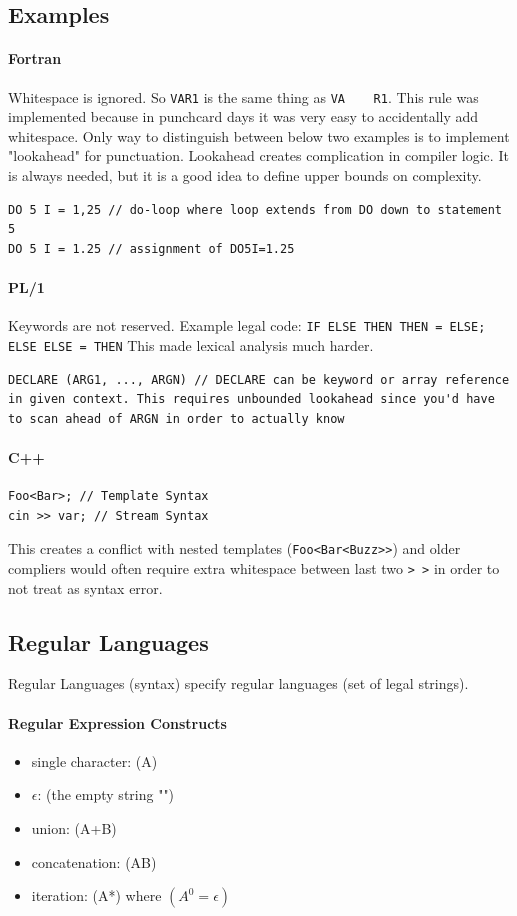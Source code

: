 \documentclass[a4paper, 10pt]{article}
\begin{document}
\subsection{Examples}
\paragraph{Fortran}
Whitespace is ignored. So \verb!VAR1! is the same thing as \verb!VA    R1!. This rule was implemented because in punchcard days it was very easy to accidentally add whitespace.
Only way to distinguish between below two examples is to implement "lookahead" for punctuation. Lookahead creates complication in compiler logic. It is always needed, but it is a good idea to define upper bounds on complexity.
\begin{lstlisting}[style=cpp]
DO 5 I = 1,25 // do-loop where loop extends from DO down to statement 5
DO 5 I = 1.25 // assignment of DO5I=1.25
\end{lstlisting}
\paragraph{PL/1}
Keywords are not reserved. Example legal code:
\verb!IF ELSE THEN THEN = ELSE; ELSE ELSE = THEN!
This made lexical analysis much harder.
\begin{lstlisting}[style=cpp]
DECLARE (ARG1, ..., ARGN) // DECLARE can be keyword or array reference in given context. This requires unbounded lookahead since you'd have to scan ahead of ARGN in order to actually know
\end{lstlisting}
\paragraph{C++}
\begin{lstlisting}[style=cpp]
Foo<Bar>; // Template Syntax
cin >> var; // Stream Syntax
\end{lstlisting}
This creates a conflict with nested templates (\verb!Foo<Bar<Buzz>>!) and older compliers would often require extra whitespace between last two \verb!> >! in order to not treat as syntax error.
\subsection{Regular Languages}
Regular Languages (syntax) specify regular languages (set of legal strings).
\paragraph{Regular Expression Constructs}
\begin{itemize}
	\item single character: (A)
	\item $\epsilon$: (the empty string "")
	\item union: (A+B)
	\item concatenation: (AB)
	\item iteration: (A*) where $(A^0 = \epsilon)$
\end{itemize}
\end{document}
